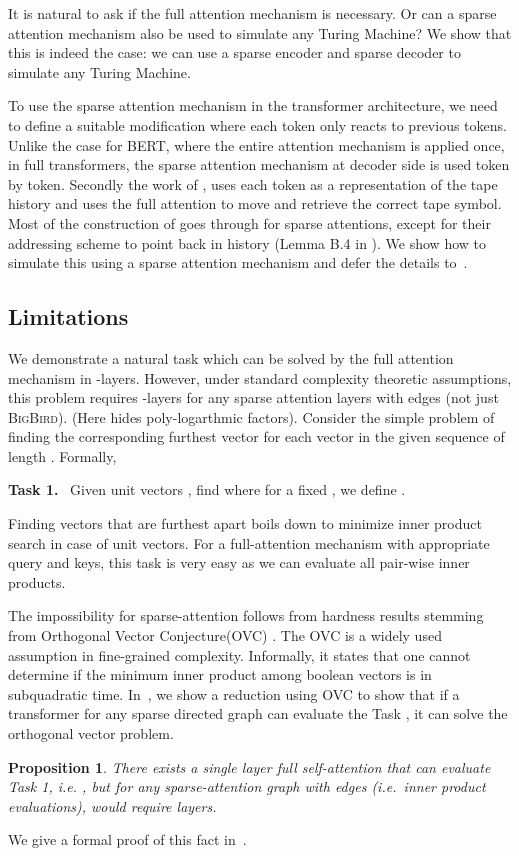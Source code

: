 \documentclass{article}
\newcommand{\bigb}{\textsc{BigBird}\xspace}
\newtheorem{proposition}{Proposition}
\begin{document}
It is natural to ask if the full attention mechanism is necessary. Or can a 
sparse attention mechanism also be used to simulate any Turing Machine? 
We show that this is indeed the case: we can use a sparse encoder and sparse decoder
to simulate any Turing Machine. 

To use the sparse attention mechanism in the transformer architecture, we need to 
define a suitable modification where each token only reacts to previous tokens. 
Unlike the case for BERT, where the entire attention mechanism is applied once, in  full 
transformers, the sparse attention mechanism at decoder side is used token by token. 
Secondly the work of \citet{Perez19}, uses each token as a representation of the tape 
history and  uses the full attention to move and retrieve the correct tape symbol.
Most of the construction of \citet{Perez19} goes through for sparse attentions, except for their 
addressing scheme to point back in history (Lemma B.4 in \citep{Perez19}).
We show how to simulate this using a sparse attention mechanism and defer the 
details to~.

\subsection{Limitations}
\label{sec:limit}
We demonstrate a natural task which can be solved by the full attention mechanism in -layers.
However, under standard complexity theoretic assumptions, this problem requires 
-layers for any sparse attention layers with  edges (not just \bigb). (Here  hides poly-logarthmic  factors). 
Consider the simple problem of finding the corresponding furthest vector 
for each vector in the given sequence of length . Formally,

\textbf{Task 1.} \ Given  unit vectors , find   where for a fixed , we define .

Finding vectors that are furthest apart boils down to minimize 
inner product search in case of unit vectors. For a full-attention mechanism 
with appropriate query 
and keys, this task is very easy as we can evaluate all pair-wise inner products. 

The impossibility for sparse-attention follows from hardness results 
stemming from Orthogonal Vector Conjecture(OVC) \citep{abboud2014consequences,abboud2015tight,backurs2015edit,williams2005new}. The OVC  is a widely used assumption
in fine-grained complexity. Informally, it states that one cannot determine if the minimum inner product among 
 boolean vectors is  in subquadratic time. In~, we show a 
reduction using  OVC to show that if a transformer  for 
any sparse directed graph  can evaluate the Task , it can solve the orthogonal vector problem.
\begin{proposition}
    There exists a single layer full self-attention  that can 
    evaluate Task 1,  i.e. , but for any sparse-attention 
    graph  with  edges (i.e.~inner product evaluations), would require  layers.
\end{proposition}
\vspace{-3mm}
We give a formal proof of this fact in~. 
\end{document}
